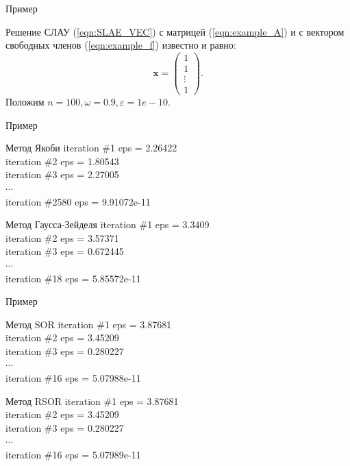 \documentclass[10pt,xcolor=pst,aspectratio=169]{beamer}
\begin{document}
\begin{frame}{Пример}

	\transdissolve[duration=0.2]
	\justifying
	\large
	Решение СЛАУ (\ref{eqn:SLAE_VEC}) с матрицей (\ref{eqn:example_A}) и с вектором свободных членов (\ref{eqn:example_f}) известно и равно:
	\begin{equation}
		\textbf{x} =
		\begin{pmatrix}
1 \\
1 \\        
\vdots \\
1
		\end{pmatrix}.
	\end{equation}
	Положим $n = 100, \omega = 0.9, \varepsilon = 1e-10$.

\end{frame}

\begin{frame}{Пример}

	\transdissolve[duration=0.2]
	\begin{block}{Метод Якоби}
		iteration \#1	 eps = 2.26422 \\
		iteration \#2	 eps = 1.80543 \\
		iteration \#3	 eps = 2.27005 \\
		$\cdots$ \\
		iteration \#2580	 eps = 9.91072e-11
	\end{block}
	\begin{block}{Метод Гаусса-Зейделя}
		iteration \#1	 eps = 3.3409 \\
		iteration \#2	 eps = 3.57371 \\
		iteration \#3	 eps = 0.672445 \\
		$\cdots$ \\
		iteration \#18	 eps = 5.85572e-11
	\end{block}

\end{frame}

\begin{frame}{Пример}

	\transdissolve[duration=0.2]
	\begin{block}{Метод SOR}
		iteration \#1	 eps = 3.87681 \\
		iteration \#2	 eps = 3.45209 \\
		iteration \#3	 eps = 0.280227 \\
		$\cdots$ \\
		iteration \#16	 eps = 5.07988e-11
	\end{block}
	\begin{block}{Метод RSOR}
		iteration \#1	 eps = 3.87681 \\
		iteration \#2	 eps = 3.45209 \\
		iteration \#3	 eps = 0.280227 \\
		$\cdots$ \\
		iteration \#16	 eps = 5.07989e-11
	\end{block}

\end{frame}
\end{document}
